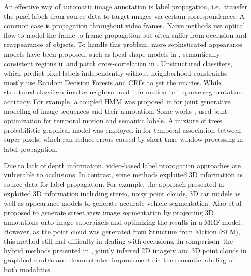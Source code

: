 An effective way of automatic image annotation is label propagation, i.e., transfer the pixel labels from source data to target images via certain correspondences. A common case is propagation throughout video frames. Naive methods use optical flow to model the frame to frame propagation \cite{chuang2002video} but often suffer from occlusion and reappearance of objects. To handle this problem, more sophisticated appearance models have been proposed, such as local shape models in \cite{Bai2009snapcut}, semantically consistent regions in \cite{arbelaez2009regions} and patch cross-correlation in \cite{badrinarayanan2013semi}. Unstructured classifiers, which predict pixel labels independently without neighborhood constraints, mostly use Random Decision Forests \cite{Breiman2001random} and CRFs to get the unaries. While structured classifiers involve neighborhood information to improve segmentation accuracy. For example, a coupled HMM was proposed in \cite{badrinarayanan2010label} for joint generative modeling of image sequences and their annotation. Some works \cite{Tsai2012motion},\cite{wang2009active} used joint optimization for temporal motion and semantic labels. A mixture of trees probabilistic graphical model was employed in \cite{badrinarayanan2013semi} for temporal association between super-pixels, which can reduce errors caused by short time-window processing in label propagation.

Due to lack of depth information, video-based label propagation approaches are vulnerable to occlusions. In contrast, some methods exploited 3D information as source data for label propagation. For example, the approach presented in \cite{chen2014beat} exploited 3D information including stereo, noisy point clouds, 3D car models as well as appearance models to generate accurate vehicle segmentation. Xiao et al \cite{multiple2009} proposed to generate street view image segmentation by projecting 3D annotations onto image superpixels and optimizing the results in a MRF model. However, as the point cloud was generated from Structure from Motion (SFM), this method still had difficulty in dealing with occlusions. In comparison, the hybrid methods presented in \cite{namin2015multimodal},\cite{Xie2016CVPR} jointly inferred 2D imagery and 3D point clouds in graphical models and demonstrated improvements in the semantic labeling of both modalities. 


